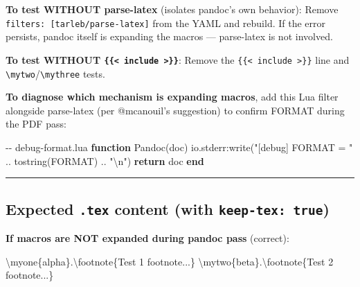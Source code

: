 \documentclass[
  letterpaper,
  DIV=11,
  numbers=noendperiod]{scrartcl}
\newenvironment{Shaded}{\begin{snugshade}}{\end{snugshade}}
\newcommand{\CommentTok}[1]{\textcolor[rgb]{0.37,0.37,0.37}{#1}}
\newcommand{\ConstantTok}[1]{\textcolor[rgb]{0.56,0.35,0.01}{#1}}
\newcommand{\ControlFlowTok}[1]{\textcolor[rgb]{0.00,0.23,0.31}{\textbf{#1}}}
\newcommand{\FunctionTok}[1]{\textcolor[rgb]{0.28,0.35,0.67}{#1}}
\newcommand{\KeywordTok}[1]{\textcolor[rgb]{0.00,0.23,0.31}{\textbf{#1}}}
\newcommand{\NormalTok}[1]{\textcolor[rgb]{0.00,0.23,0.31}{#1}}
\newcommand{\OperatorTok}[1]{\textcolor[rgb]{0.37,0.37,0.37}{#1}}
\newcommand{\SpecialCharTok}[1]{\textcolor[rgb]{0.37,0.37,0.37}{#1}}
\newcommand{\StringTok}[1]{\textcolor[rgb]{0.13,0.47,0.30}{#1}}
\newcommand{\VariableTok}[1]{\textcolor[rgb]{0.07,0.07,0.07}{#1}}
\begin{document}
\textbf{To test WITHOUT parse-latex} (isolates pandoc's own behavior):
Remove \texttt{filters:\ {[}tarleb/parse-latex{]}} from the YAML and
rebuild. If the error persists, pandoc itself is expanding the macros
--- parse-latex is not involved.

\textbf{To test WITHOUT
\texttt{\{\{\textless{}\ include\ \textgreater{}\}\}}}: Remove the
\texttt{\{\{\textless{}\ include\ \textgreater{}\}\}} line and
\texttt{\textbackslash{}mytwo}/\texttt{\textbackslash{}mythree} tests.

\textbf{To diagnose which mechanism is expanding macros}, add this Lua
filter alongside parse-latex (per @mcanouil's suggestion) to confirm
FORMAT during the PDF pass:

\begin{Shaded}
\begin{Highlighting}[]
\CommentTok{{-}{-} debug{-}format.lua}
\KeywordTok{function}\NormalTok{ Pandoc}\OperatorTok{(}\VariableTok{doc}\OperatorTok{)}
  \FunctionTok{io.stderr}\OperatorTok{:}\FunctionTok{write}\OperatorTok{(}\StringTok{"[debug] FORMAT = "} \OperatorTok{..} \FunctionTok{tostring}\OperatorTok{(}\ConstantTok{FORMAT}\OperatorTok{)} \OperatorTok{..} \StringTok{"}\SpecialCharTok{\textbackslash{}n}\StringTok{"}\OperatorTok{)}
  \ControlFlowTok{return} \VariableTok{doc}
\KeywordTok{end}
\end{Highlighting}
\end{Shaded}

\begin{center}\rule{0.5\linewidth}{0.5pt}\end{center}

\subsection{\texorpdfstring{Expected \texttt{.tex} content (with
\texttt{keep-tex:\ true})}{Expected .tex content (with keep-tex: true)}}\label{expected-.tex-content-with-keep-tex-true}

\textbf{If macros are NOT expanded during pandoc pass} (correct):

\begin{Shaded}
\begin{Highlighting}[]
\FunctionTok{\textbackslash{}myone}\NormalTok{\{alpha\}.}\FunctionTok{\textbackslash{}footnote}\NormalTok{\{Test 1 footnote...\}}
\FunctionTok{\textbackslash{}mytwo}\NormalTok{\{beta\}.}\FunctionTok{\textbackslash{}footnote}\NormalTok{\{Test 2 footnote...\}}
\end{Highlighting}
\end{Shaded}
\end{document}
